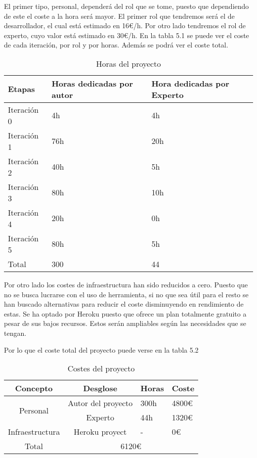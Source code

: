 El primer tipo, personal, dependerá del rol que se tome, puesto que dependiendo de este
el coste a la hora será mayor. El primer rol que tendremos será el de desarrollador, el
cual está estimado en 16€/h. Por otro lado tendremos el rol de experto, cuyo valor está estimado
en 30€/h. En la tabla 5.1 se puede ver el coste de cada iteración, por rol y por horas.
Además se podrá ver el coste total.

\begin{table}[]
  \centering
  \caption{Horas del proyecto}
  \label{tab:Horas del proyecto}
  \begin{tabular}{|l|l|l|}
    \hline
    Etapas & Horas dedicadas por autor & Hora dedicadas por Experto \\ \hline
    Iteración 0 & 4h & 4h \\ \hline
    Iteración 1 & 76h & 20h \\ \hline
    Iteración 2 & 40h & 5h \\ \hline
    Iteración 3 & 80h & 10h \\ \hline
    Iteración 4 & 20h & 0h \\ \hline
    Iteración 5 & 80h & 5h \\ \hline
    Total & 300 & 44 \\ \hline
  \end{tabular}
\end{table}

Por otro lado los costes de infraestructura han sido reducidos a cero. Puesto que no se
busca lucrarse con el uso de herramienta, si no que sea útil para el resto se han buscado
alternativas para reducir el coste disminuyendo en rendimiento de estas. Se ha optado
por Heroku puesto que ofrece un plan totalmente gratuito a pesar de sus bajos recursos.
Estos serán ampliables según las necesidades que se tengan.

Por lo que el coste total del proyecto puede verse en la tabla 5.2

\begin{table}[]
  \centering
  \caption{Costes del proyecto}
  \label{tab:Costes del proyecto}
  \begin{tabular}{|c|c|l|l|}
    \hline
    Concepto & Desglose & Horas & Coste \\ \hline
    \multirow{2}{*}{Personal} & Autor del proyecto & 300h & 4800€ \\ \cline{2-4}
    & Experto & 44h & 1320€ \\ \hline
    Infraestructura & Heroku proyect & - & 0€ \\ \hline
    Total & \multicolumn{3}{c|}{6120€} \\ \hline
  \end{tabular}
\end{table}
